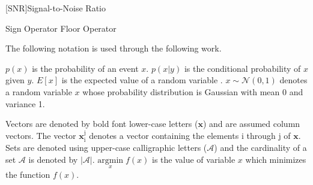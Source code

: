 \newcommand{\glossaryfirstcolumnlength}{\hspace{6.1em}}
%
\addsec{\abbreviationsname}
\begin{acronym}[\glossaryfirstcolumnlength]
 [\ensuremath{\mathrm{SNR}}]{Signal-to-Noise Ratio}
\end{acronym}
\addsec{\operatorsname}
%
\begin{symbollist}{\glossaryfirstcolumnlength}
  Sign Operator
    Floor Operator

\end{symbollist}
%

The following notation is used through the following work. \par
$p(x)$ is the probability of an event $x$.
$p(x|y)$ is the conditional probability of $x$ given $y$.
$E[x]$ is the expected value of a random variable .
$x \sim \mathcal{N}(0,1)$ denotes a random variable $x$ whose probability distribution is Gaussian with mean 0 and variance 1. 

Vectors are denoted by bold font lower-case letters ($\mathbf{x}$) and are assumed column vectors.
The vector $\mathbf{x}_{\mathrm{i}}^{\mathrm{j}}$ denotes a vector containing the elements i through j of $\mathbf{x}$. Sets are denoted using upper-case calligraphic letters ($\mathcal{A}$) and the cardinality of a set $\mathcal{A}$ is denoted by $|\mathcal{A}|$.
$\underset{x}{\text{argmin}} \; f(x)$ is the value of variable $x$ which minimizes the function $f(x)$.

\clearpage
